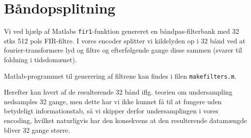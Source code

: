 \section{Båndopsplitning}
Vi ved hjælp af Matlabs \texttt{fir1}-funktion genereret en båndpas-filterbank med 32 stks 512 pols FIR-filtre. I vores encoder splitter vi kildelyden op i 32 bånd ved at fourier-transformere lyd og filtre og efterfølgende gange disse sammen (svarer til foldning i tidsdomænet).

Matlab-programmet til generering af filtrene kan findes i filen \texttt{makefilters.m}.

Herefter kan hvert af de resulterende 32 bånd iflg. teorien om undersampling nedsamples 32 gange, men dette har vi ikke kunnet få til at fungere uden betydeligt informationstab, så vi skipper derfor undersamplingen i vores encoding, hvilket naturligvis har den konsekvens at den resulterende datamængde bliver 32 gange større.
